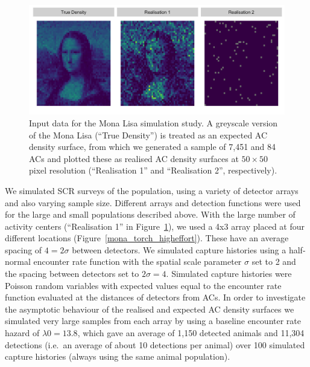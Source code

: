 \documentclass[10pt,a4paper]{article}
\begin{document}
\begin{figure}[htbp]
\centering
\includegraphics[width=1\textwidth]{mona_inputdata.png}
\caption{Input data for the Mona Lisa simulation study. A greyscale version of the Mona Lisa (``True Density'') is treated as an expected AC density surface, from which we generated a sample of 7,451 and 84 ACs and plotted these as realised AC density surfaces at $50\times 50$ pixel resolution (``Realisation 1'' and ``Realisation 2'', respectively).}
\label{mlinputs}
\end{figure}

We simulated SCR surveys of the population, using a variety of detector arrays and also varying sample size. Different arrays and detection functions were used for the large and small populations described above. With the large number of activity centers (``Realisation 1'' in Figure~\ref{mlinputs}), we used a 4x3 array placed at four different locations (Figure~\ref{mona_torch_higheffort}). These have an average spacing of $4=2\sigma$ between detectors. We simulated capture histories using a half-normal encounter rate function with the spatial scale parameter $\sigma$ set to 2 and the spacing between detectors set to $2\sigma=4$. Simulated capture histories were Poisson random variables with expected values equal to the encounter rate function evaluated at the distances of detectors from ACs. In order to investigate the asymptotic behaviour of the realised and expected AC density surfaces we simulated very large samples from each array by using a baseline encounter rate hazard of $\lambda0=13.8$, which gave an average of 1,150 detected animals and 11,304 detections (i.e.\ an average of about 10 detections per animal) over 100 simulated capture histories (always using the same animal population). 
\end{document}
